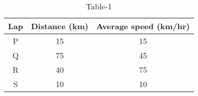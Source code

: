 \begin{table}[htbp]
\centering
\caption{Table-1}
\label{table1}
\begin{tabular}{|c|c|c|}
\hline
Lap & Distance (km) & Average speed (km/hr) \\
\hline
P & 15 & 15 \\
Q & 75 & 45 \\
R & 40 & 75 \\
S & 10 & 10 \\
\hline
\end{tabular}\

\end{table}